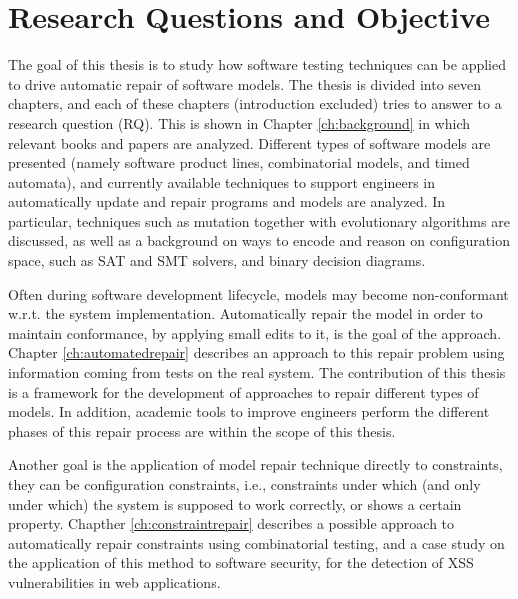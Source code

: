\section{Research Questions and Objective}\label{sec:rq}
The goal of this thesis is to study how software testing techniques can be applied to drive automatic repair of software models.
The thesis is divided into seven chapters, and each of these chapters (introduction excluded) tries to answer to a research question (RQ).
This is shown in Chapter \ref{ch:background} in which relevant books and papers are analyzed. %
Different types of software models are presented (namely software product lines, combinatorial models, and timed automata), and currently available techniques to support engineers in automatically update and repair programs and models are analyzed. In particular, techniques such as mutation together with evolutionary algorithms are discussed, as well as a background on ways to encode and reason on configuration space, such as SAT and SMT solvers, and binary decision diagrams.

Often during software development lifecycle, models may become non-conformant w.r.t. the system implementation.
Automatically repair the model in order to maintain conformance, by applying small edits to it, is the goal of the approach. Chapter \ref{ch:automatedrepair} describes an approach to this repair problem using information coming from tests on the real system. The contribution of this thesis is a framework for the development of approaches to repair different types of models. 
In addition, academic tools to improve engineers perform the different phases of this repair process are within the scope of this thesis. %

Another goal is the application of model repair technique directly to constraints, they can be configuration constraints, i.e., constraints under which (and only under which) the system is supposed to work correctly, or shows a certain property. 
Chapther \ref{ch:constraintrepair} describes a possible approach to automatically repair constraints using combinatorial testing, and a case study on the application of this method to software security, for the detection of XSS vulnerabilities in web applications.

